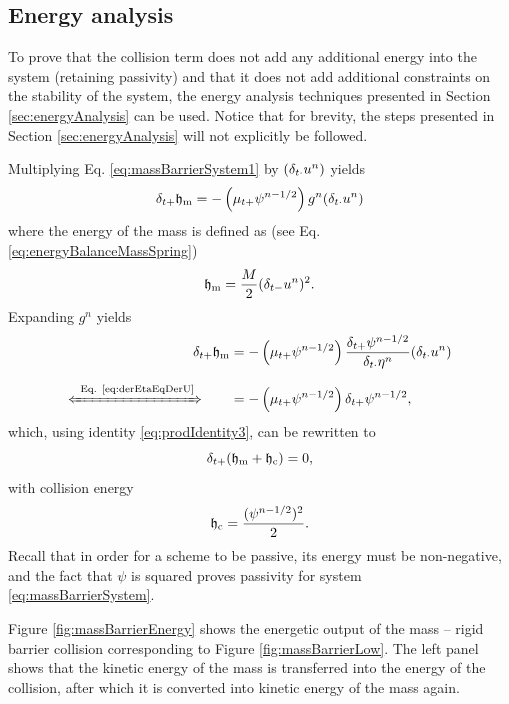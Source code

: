 \subsection{Energy analysis}\label{sec:energyAnalysisMassBarrier}
To prove that the collision term does not add any additional energy into the system (retaining passivity) and that it does not add additional constraints on the stability of the system, the energy analysis techniques presented in Section \ref{sec:energyAnalysis} can be used. Notice that for brevity, the steps presented in Section \ref{sec:energyAnalysis} will not explicitly be followed.

Multiplying Eq. \eqref{eq:massBarrierSystem1} by $(\delta_{t\cdot} u^n)$ yields 
\begin{equation*}
    \delta_{t+} \mathfrak{h}_{\text{m}}  = -\left(\mu_{t+}\psi^{n-1/2}\right)g^n (\delta_{t\cdot} u^n)
\end{equation*}
where the energy of the mass is defined as (see Eq. \eqref{eq:energyBalanceMassSpring})
\begin{equation}
    \mathfrak{h}_{\text{m}} = \frac{M}{2}(\delta_{t-}u^n)^2.
\end{equation}
Expanding $g^n$ yields 
\begin{align*}
    \dtp \h_\mtxt  &= -\left(\mtp\psi^{n-1/2}\right)\frac{\dtp \psi^{n-1/2}}{\dtd \eta^n}(\dtd \un)\\
    \xLeftrightarrow{\mystrut\ \text{Eq. \eqref{eq:derEtaEqDerU}}} \qquad & = -\left(\mtp\psi^{n-1/2}\right)\dtp \psi^{n-1/2},
\end{align*}
which, using identity \eqref{eq:prodIdentity3}, can be rewritten to 
\begin{equation}
    \delta_{t+}(\mathfrak{h}_{\text{m}} + \mathfrak{h}_{\text{c}}) = 0,
\end{equation}
with collision energy
\begin{equation}\label{eq:collisionEnergy}
    \mathfrak{h}_{\text{c}} = \frac{(\psi^{n-1/2})^2}{2}.
\end{equation}
Recall that in order for a scheme to be passive, its energy must be non-negative, and the fact that $\psi$ is squared proves passivity for system \eqref{eq:massBarrierSystem}.

Figure \ref{fig:massBarrierEnergy} shows the energetic output of the mass -- rigid barrier collision corresponding to Figure \ref{fig:massBarrierLow}. The left panel shows that the kinetic energy of the mass is transferred into the energy of the collision, after which it is converted into kinetic energy of the mass again.

